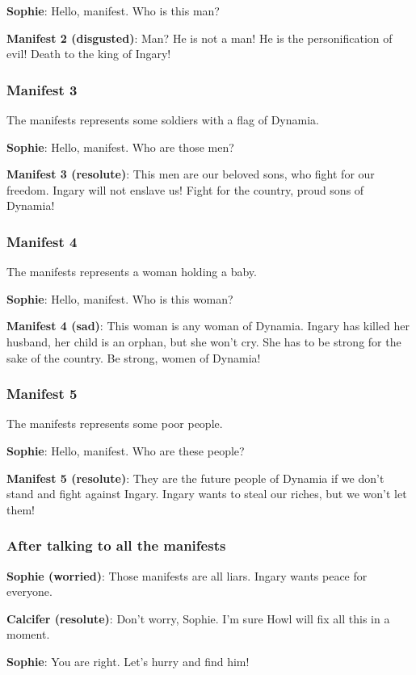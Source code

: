 \textbf{Sophie}: Hello, manifest. Who is this man?

\textbf{Manifest 2 (disgusted)}: Man? He is not a man! He is the personification of evil! Death to the king of Ingary!

\subsubsection*{Manifest 3}
The manifests represents some soldiers with a flag of Dynamia.

\textbf{Sophie}: Hello, manifest. Who are those men?

\textbf{Manifest 3 (resolute)}: This men are our beloved sons, who fight for our freedom. Ingary will not enslave us! Fight for the country, proud sons of Dynamia!

\subsubsection*{Manifest 4}
The manifests represents a woman holding a baby.

\textbf{Sophie}: Hello, manifest. Who is this woman?

\textbf{Manifest 4 (sad)}: This woman is any woman of Dynamia. Ingary has killed her husband, her child is an orphan, but she won't cry. She has to be strong for the sake of the country. Be strong, women of Dynamia!

\subsubsection*{Manifest 5}
The manifests represents some poor people.

\textbf{Sophie}: Hello, manifest. Who are these people?

\textbf{Manifest 5 (resolute)}: They are the future people of Dynamia if we don't stand and fight against Ingary. Ingary wants to steal our riches, but we won't let them!

\subsubsection*{After talking to all the manifests}
\textbf{Sophie (worried)}: Those manifests are all liars. Ingary wants peace for everyone.

\textbf{Calcifer (resolute)}: Don't worry, Sophie. I'm sure Howl will fix all this in a moment.

\textbf{Sophie}: You are right. Let's hurry and find him!


